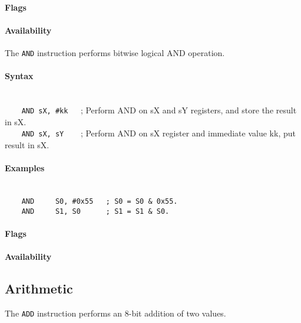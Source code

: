         \paragraph{Flags}

        \paragraph{Availability}
            \pbavailability{\yes}{\yes}{\yes}{\yes}{\yes}

    \clearpage
        The \texttt{AND} instruction performs bit\-wise logical AND operation.

        \paragraph{Syntax}
            ~\\
            \verb'    AND sX, #kk   '; Perform AND on sX and sY registers, and store the result in sX.\\
            \verb'    AND sX, sY    '; Perform AND on sX register and immediate value kk, put result in sX.

        \paragraph{Examples}
            ~\\
            \verb'    AND     S0, #0x55   ; S0 = S0 & 0x55.'\\
            \verb'    AND     S1, S0      ; S1 = S1 & S0.'

        \paragraph{Flags}

        \paragraph{Availability}
            \pbavailability{\yes}{\yes}{\yes}{\yes}{\yes}

\clearpage
\subsection{Arithmetic}
        The \texttt{ADD} instruction performs an 8-bit addition of two values.

